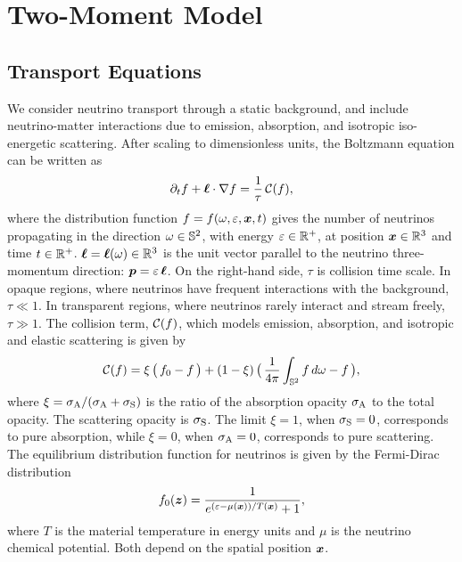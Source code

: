 \section{Two-Moment Model}
\label{se:Two-MomentModel}

\subsection{Transport Equations}

We consider neutrino transport through a static background, and include neutrino-matter interactions due to emission, absorption, and isotropic iso-energetic scattering.  
After scaling to dimensionless units, the Boltzmann equation can be written as
\begin{equation}
  \pd{f}{t}+\vect{\ell}\cdot\nabla f
  =\f{1}{\tau}\,\cC(f),
  \label{eq:boltzmann}
\end{equation}
where the distribution function $f = f(\omega,\varepsilon,\boldsymbol{x},t)$ gives the number of neutrinos propagating in the direction $\omega\in\mathbb{S}^{2}$, with energy $\varepsilon\in\mathbb{R}^{+}$, at position $\boldsymbol{x}\in\mathbb{R}^{3}$ and time $t\in\mathbb{R}^{+}$.  
$\boldsymbol{\ell} = \boldsymbol{\ell}(\omega)\in\mathbb{R}^{3}$ is the unit vector parallel to the neutrino three-momentum direction: $\boldsymbol{p}=\varepsilon\,\boldsymbol{\ell}$.
On the right-hand side, $\tau$ is collision time scale.  
In opaque regions, where neutrinos have frequent interactions with the background, $\tau\ll1$.  
In transparent regions, where neutrinos rarely interact and stream freely, $\tau\gg1$.
The collision term, $\mathcal{C}(f)$, which models emission, absorption, and isotropic and elastic scattering is given by
\begin{equation}
  \cC(f)=\xi\,\big(\,f_{0}-f\,\big)
  +(1-\xi)\,\big(\,\f{1}{4\pi}\int_{\bbS^{2}}f\,d\omega-f\,\big),
  \label{eq:collisionTerm}
\end{equation}
where $\xi = \sigma_{{\rm A}} / (\sigma_{{\rm A}}  + \sigma_{{\rm S}} )$ is the ratio of the absorption opacity $\sigma_{{\rm A}}$ to the total opacity.  
The scattering opacity is $\sigma_{{\rm S}}$.  
The limit $\xi = 1$, when $\sigma_{{\rm S}} = 0$, corresponds to pure absorption, while $\xi = 0$, when $\sigma_{{\rm A}} = 0$, corresponds to pure scattering.  
The equilibrium distribution function for neutrinos is given by the Fermi-Dirac distribution
\begin{equation}
  f_{0}(\vect{z})=\f{1}{e^{(\varepsilon-\mu(\vect{x}))/T(\vect{x})}+1}, 
  \label{eq:fermiDirac}
\end{equation}
where $T$ is the material temperature in energy units and $\mu$ is the neutrino chemical potential.
Both depend on the spatial position $\boldsymbol{x}$.

